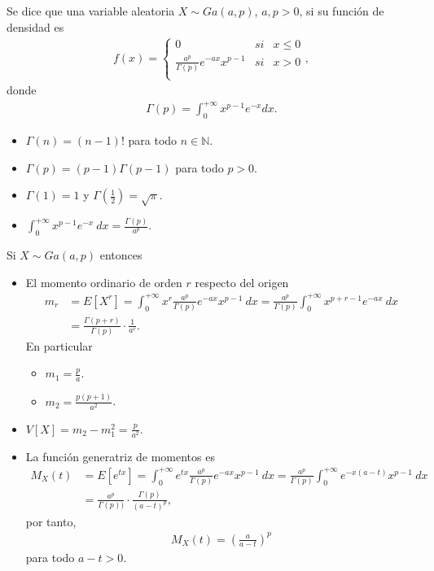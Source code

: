 \begin{defi}
Se dice que una variable aleatoria $X \sim Ga(a,p)$, $a,p > 0$, si su función de densidad es
\begin{align*}
    f(x) = \left\{ \begin{array}{lcc}
             0 &  si  & x \leq 0\\
             \frac{a^p}{\Gamma(p)}e^{-ax}x^{p-1} &  si  & x > 0\\
             \end{array}
        \right. ,
\end{align*}
donde
\begin{align*}
    \Gamma(p) = \int_{0}^{+\infty}{x^{p-1}e^{-x}  dx}.
\end{align*}
\end{defi}

\begin{obs}
\begin{itemize}
    \item $\Gamma(n) = (n-1)!$ para todo $n \in \mathbb{N}$.
    \item $\Gamma(p) = (p-1)\Gamma(p-1)$ para todo $p > 0$.
    \item $\Gamma(1) = 1$ y $\Gamma\left( \frac{1}{2}\right) = \sqrt{\pi}$.
    \item $\int_{0}^{+\infty}{x^{p-1}e^{-x} \ dx} = \frac{\Gamma(p)}{a^p}$.
\end{itemize}
\end{obs}

\begin{obs}
Si $X \sim Ga(a,p)$ entonces
\begin{itemize}
    \item El momento ordinario de orden $r$ respecto del origen
    \begin{align*}
        m_r &= E[X^r] = \int_{0}^{+\infty}{x^r\frac{a^p}{\Gamma(p)}e^{-ax}x^{p-1} \ dx} = \frac{a^p}{\Gamma(p)}\int_{0}^{+\infty}{x^{p + r - 1}e^{-ax} \ dx}\\\
        &= \frac{\Gamma(p + r)}{\Gamma(p)} \cdot \frac{1}{a^r}.
    \end{align*}
    En particular
    \begin{itemize}
        \item $m_1 = \frac{p}{a}$.
        \item $m_2 = \frac{p(p + 1)}{a^2}$.
    \end{itemize}
    \item $V[X] = m_2 - m_1^2 = \frac{p}{a^2}$.
    \item La función generatriz de momentos es
    \begin{align*}
        M_X(t) &= E[e^{tx}] = \int_{0}^{+\infty}{e^{tx}\frac{a^p}{\Gamma(p)}e^{-ax}x^{p-1} \ dx} = \frac{a^p}{\Gamma(p)}\int_{0}^{+\infty}{e^{-x(a - t)}x^{p-1} \ dx}\\
        &= \frac{a^p}{\Gamma(p))} \cdot \frac{\Gamma(p)}{(a - t)^p},
    \end{align*}
    por tanto,
    \begin{align*}
        M_X(t) = \left( \frac{a}{a- t} \right)^p
    \end{align*}
    para todo $a - t > 0$.
\end{itemize}
\end{obs}

